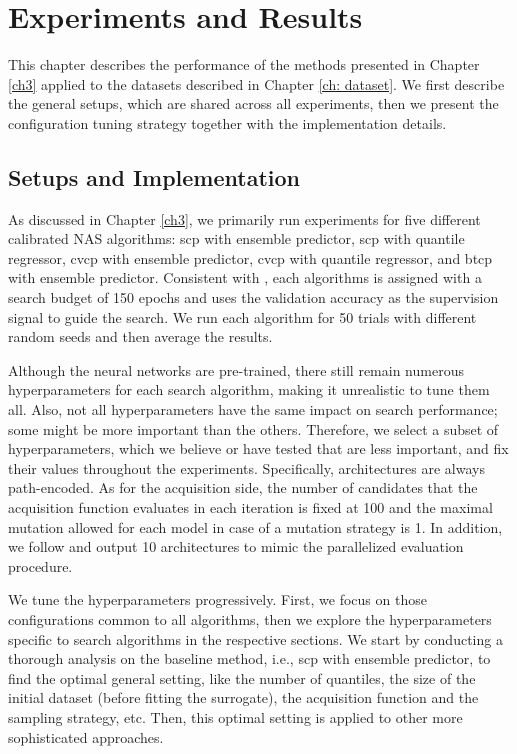 \documentclass[a4paper,oneside,bibliography=totoc]{scrbook}
\begin{document}
{%




\chapter{Experiments and Results}
This chapter describes the performance of the methods presented in Chapter \ref{ch3}  applied to the datasets described in Chapter \ref{ch: dataset}. We first describe the general setups, which are shared across all experiments, then we present the configuration tuning strategy together with the implementation details. 

\section{Setups and Implementation}
As discussed in Chapter \ref{ch3}, we primarily run experiments for five different calibrated NAS algorithms: \gls{scp} with ensemble predictor, \gls{scp} with quantile regressor, \gls{cvcp} with ensemble predictor, \gls{cvcp} with quantile regressor, and \gls{btcp} with ensemble predictor. Consistent with \cite{white2019bananas}, each algorithms is assigned with a search budget of 150 epochs and uses the validation accuracy as the supervision signal to guide the search. We run each algorithm for 50 trials with different random seeds and then average the results.

Although the neural networks are pre-trained, there still remain numerous hyperparameters for each search algorithm, making it unrealistic to tune them all. Also, not all hyperparameters have the same impact on search performance; some might be more important than the others. Therefore, we select a subset of hyperparameters, which we believe or have tested that are less important, and fix their values throughout the experiments. Specifically, architectures are always path-encoded. As for the acquisition side, the number of candidates that the acquisition function evaluates in each iteration is fixed at 100 and the maximal mutation allowed for each model in case of a mutation strategy is 1. In addition, we follow \cite{white2019bananas} and output 10 architectures to mimic the parallelized evaluation procedure.

We tune the hyperparameters progressively. First, we focus on those configurations common to all algorithms, then we explore the hyperparameters specific to search algorithms in the respective sections. We start by conducting a thorough analysis on the baseline method, i.e., \gls{scp} with ensemble predictor, to find the optimal general setting, like the number of quantiles, the size of the initial dataset (before fitting the surrogate), the acquisition function and the sampling strategy, etc. Then, this optimal setting is applied to other more sophisticated approaches.

}
\end{document}
